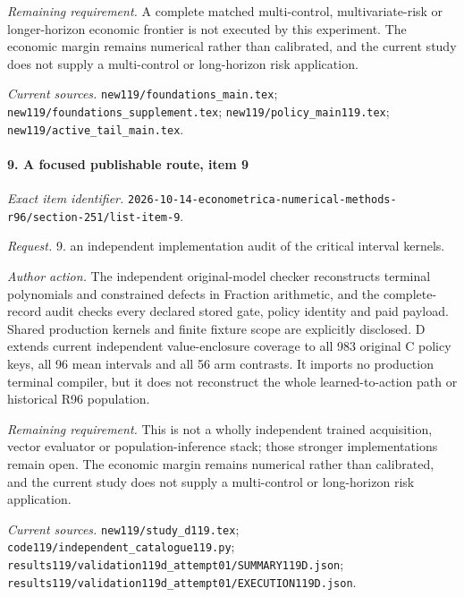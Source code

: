 \par\emph{Remaining requirement.} A complete matched multi-control, multivariate-risk or longer-horizon economic frontier is not executed by this experiment. The economic margin remains numerical rather than calibrated, and the current study does not supply a multi-control or long-horizon risk application.

\par\emph{Current sources.} \nolinkurl{new119/foundations_main.tex}; \nolinkurl{new119/foundations_supplement.tex}; \nolinkurl{new119/policy_main119.tex}; \nolinkurl{new119/active_tail_main.tex}.

\paragraph{9. A focused publishable route, item 9}

\emph{Exact item identifier.} \nolinkurl{2026-10-14-econometrica-numerical-methods-r96/section-251/list-item-9}.

\par\emph{Request.} 9. an independent implementation audit of the critical interval kernels.

\par\emph{Author action.} The independent original-model checker reconstructs terminal polynomials and constrained defects in Fraction arithmetic, and the complete-record audit checks every declared stored gate, policy identity and paid payload. Shared production kernels and finite fixture scope are explicitly disclosed. D extends current independent value-enclosure coverage to all 983 original C policy keys, all 96 mean intervals and all 56 arm contrasts. It imports no production terminal compiler, but it does not reconstruct the whole learned-to-action path or historical R96 population.

\par\emph{Remaining requirement.} This is not a wholly independent trained acquisition, vector evaluator or population-inference stack; those stronger implementations remain open. The economic margin remains numerical rather than calibrated, and the current study does not supply a multi-control or long-horizon risk application.

\par\emph{Current sources.} \nolinkurl{new119/study_d119.tex}; \nolinkurl{code119/independent_catalogue119.py}; \nolinkurl{results119/validation119d_attempt01/SUMMARY119D.json}; \nolinkurl{results119/validation119d_attempt01/EXECUTION119D.json}.

